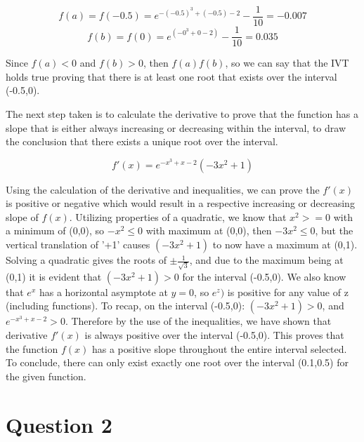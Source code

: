 \documentclass{article}
\begin{document}
    \begin{equation}
         f(a) = f(-0.5) = e^{-(-0.5)^3+(-0.5)-2}-\frac{1}{10} = -0.007 
    \end{equation}
    \begin{equation}
         f(b) = f(0) = e^{(-0^3+0-2)}-\frac{1}{10} = 0.035
    \end{equation}

    Since $f(a) < 0$ and $f(b) > 0$, then $f(a)f(b)$, so we can say that the IVT holds true proving that there is at least one root that exists over the interval (-0.5,0).

    The next step taken is to calculate the derivative to prove that the function has a slope that is either always increasing or decreasing within the interval, to draw the conclusion that there exists a unique root over the interval.

    \begin{equation}
         f'(x) = e^{-x^3+x-2}(-3x^2+1) 
    \end{equation}

    Using the calculation of the derivative and inequalities, we can prove the $f'(x)$ is positive or negative which would result in a respective increasing or decreasing slope of $f(x)$.  Utilizing properties of a quadratic, we know that $x^2 >= 0$ with a minimum of (0,0), so $-x^2 \le 0$ with maximum at (0,0), then $-3x^2 \le 0 $, but the vertical translation of '+1' causes $(-3x^2+1)$ to now have a maximum at (0,1).  Solving a quadratic gives the roots of $\pm\frac{1}{\sqrt{3}}$, and due to the maximum being at (0,1) it is evident that $(-3x^2+1) > 0$ for the interval (-0.5,0).  We also know that $e^x$ has a horizontal asymptote at $y=0$, so $e^z)$ is positive for any value of z (including functions). To recap, on the interval (-0.5,0): $(-3x^2+1) > 0$, and $e^{-x^3+x-2} > 0$.  Therefore by the use of the inequalities, we have shown that derivative $f'(x)$ is always positive over the interval (-0.5,0).  This proves that the function $f(x)$ has a positive slope throughout the entire interval selected.  To conclude, there can only exist exactly one root over the interval (0.1,0.5) for the given function.

\newpage
\section*{Question 2}

\end{document}
